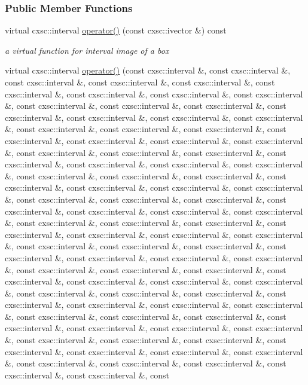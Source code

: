 \subsubsection*{\-Public \-Member \-Functions}
\begin{DoxyCompactItemize}
\item 
virtual cxsc\-::interval \hyperlink{classsubpavings_1_1MappedFobj100D_aa0e7fdeba49e7ee43e46d38f630935ce}{operator()} (const cxsc\-::ivector \&) const 
\begin{DoxyCompactList}\small\item\em a virtual function for interval image of a box \end{DoxyCompactList}\item 
virtual cxsc\-::interval \hyperlink{classsubpavings_1_1MappedFobj100D_a6439390e913abd6ccf9626eaa1dacd16}{operator()} (const cxsc\-::interval \&, const cxsc\-::interval \&, const cxsc\-::interval \&, const cxsc\-::interval \&, const cxsc\-::interval \&, const cxsc\-::interval \&, const cxsc\-::interval \&, const cxsc\-::interval \&, const cxsc\-::interval \&, const cxsc\-::interval \&, const cxsc\-::interval \&, const cxsc\-::interval \&, const cxsc\-::interval \&, const cxsc\-::interval \&, const cxsc\-::interval \&, const cxsc\-::interval \&, const cxsc\-::interval \&, const cxsc\-::interval \&, const cxsc\-::interval \&, const cxsc\-::interval \&, const cxsc\-::interval \&, const cxsc\-::interval \&, const cxsc\-::interval \&, const cxsc\-::interval \&, const cxsc\-::interval \&, const cxsc\-::interval \&, const cxsc\-::interval \&, const cxsc\-::interval \&, const cxsc\-::interval \&, const cxsc\-::interval \&, const cxsc\-::interval \&, const cxsc\-::interval \&, const cxsc\-::interval \&, const cxsc\-::interval \&, const cxsc\-::interval \&, const cxsc\-::interval \&, const cxsc\-::interval \&, const cxsc\-::interval \&, const cxsc\-::interval \&, const cxsc\-::interval \&, const cxsc\-::interval \&, const cxsc\-::interval \&, const cxsc\-::interval \&, const cxsc\-::interval \&, const cxsc\-::interval \&, const cxsc\-::interval \&, const cxsc\-::interval \&, const cxsc\-::interval \&, const cxsc\-::interval \&, const cxsc\-::interval \&, const cxsc\-::interval \&, const cxsc\-::interval \&, const cxsc\-::interval \&, const cxsc\-::interval \&, const cxsc\-::interval \&, const cxsc\-::interval \&, const cxsc\-::interval \&, const cxsc\-::interval \&, const cxsc\-::interval \&, const cxsc\-::interval \&, const cxsc\-::interval \&, const cxsc\-::interval \&, const cxsc\-::interval \&, const cxsc\-::interval \&, const cxsc\-::interval \&, const cxsc\-::interval \&, const cxsc\-::interval \&, const cxsc\-::interval \&, const cxsc\-::interval \&, const cxsc\-::interval \&, const cxsc\-::interval \&, const cxsc\-::interval \&, const cxsc\-::interval \&, const cxsc\-::interval \&, const cxsc\-::interval \&, const cxsc\-::interval \&, const cxsc\-::interval \&, const cxsc\-::interval \&, const cxsc\-::interval \&, const cxsc\-::interval \&, const cxsc\-::interval \&, const cxsc\-::interval \&, const cxsc\-::interval \&, const cxsc\-::interval \&, const cxsc\-::interval \&, const cxsc\-::interval \&, const cxsc\-::interval \&, const cxsc\-::interval \&, const cxsc\-::interval \&, const cxsc\-::interval \&, const cxsc\-::interval \&, const 
\end{DoxyCompactItemize}
